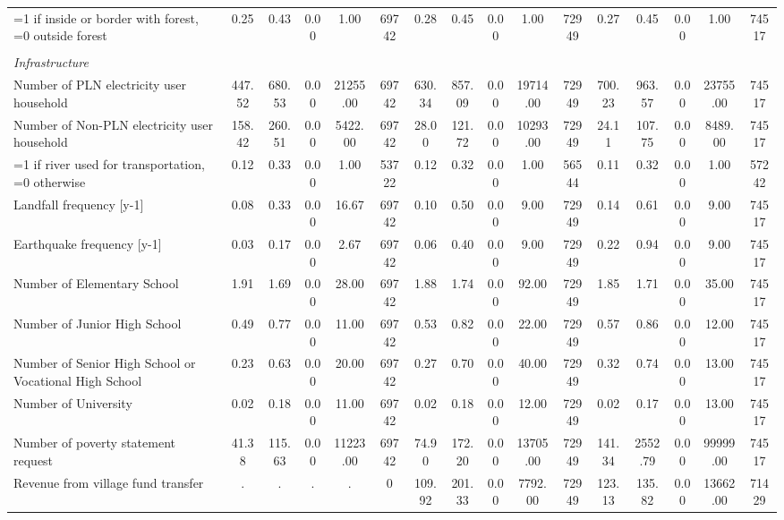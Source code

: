 \begin{tabular}{l*{3}{ccccc}}
=1 if inside or border with forest, =0 outside forest&     0.25&     0.43&     0.00&     1.00&    69742&     0.28&     0.45&     0.00&     1.00&    72949&     0.27&     0.45&     0.00&     1.00&    74517\\
\vspace{0.1em} \\ \emph{Infrastructure}&         &         &         &         &         &         &         &         &         &         &         &         &         &         &         \\
Number of PLN electricity user household&   447.52&   680.53&     0.00& 21255.00&    69742&   630.34&   857.09&     0.00& 19714.00&    72949&   700.23&   963.57&     0.00& 23755.00&    74517\\
Number of Non-PLN electricity user household&   158.42&   260.51&     0.00&  5422.00&    69742&    28.00&   121.72&     0.00& 10293.00&    72949&    24.11&   107.75&     0.00&  8489.00&    74517\\
=1 if river used for transportation, =0 otherwise&     0.12&     0.33&     0.00&     1.00&    53722&     0.12&     0.32&     0.00&     1.00&    56544&     0.11&     0.32&     0.00&     1.00&    57242\\
Landfall frequency [y-1]&     0.08&     0.33&     0.00&    16.67&    69742&     0.10&     0.50&     0.00&     9.00&    72949&     0.14&     0.61&     0.00&     9.00&    74517\\
Earthquake frequency [y-1]&     0.03&     0.17&     0.00&     2.67&    69742&     0.06&     0.40&     0.00&     9.00&    72949&     0.22&     0.94&     0.00&     9.00&    74517\\
Number of Elementary School&     1.91&     1.69&     0.00&    28.00&    69742&     1.88&     1.74&     0.00&    92.00&    72949&     1.85&     1.71&     0.00&    35.00&    74517\\
Number of Junior High School&     0.49&     0.77&     0.00&    11.00&    69742&     0.53&     0.82&     0.00&    22.00&    72949&     0.57&     0.86&     0.00&    12.00&    74517\\
Number of Senior High School or Vocational High School&     0.23&     0.63&     0.00&    20.00&    69742&     0.27&     0.70&     0.00&    40.00&    72949&     0.32&     0.74&     0.00&    13.00&    74517\\
Number of University&     0.02&     0.18&     0.00&    11.00&    69742&     0.02&     0.18&     0.00&    12.00&    72949&     0.02&     0.17&     0.00&    13.00&    74517\\
Number of poverty statement request&    41.38&   115.63&     0.00& 11223.00&    69742&    74.90&   172.20&     0.00& 13705.00&    72949&   141.34&  2552.79&     0.00& 99999.00&    74517\\
Revenue from village fund transfer&        .&        .&        .&        .&        0&   109.92&   201.33&     0.00&  7792.00&    72949&   123.13&   135.82&     0.00& 13662.00&    71429\\
\bottomrule
\end{tabular}
